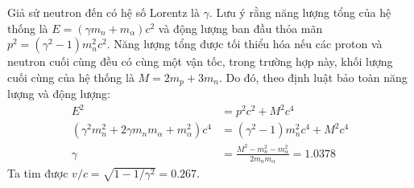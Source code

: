 \begin{solution}
Giả sử neutron đến có hệ số Lorentz là $\gamma$. Lưu ý rằng năng lượng tổng của hệ thống là $E =(\gamma m_n + m_\alpha)c^2$ và động lượng ban đầu thỏa mãn $p^2 = (\gamma^2 - 1)m_n^2 c^2$. Năng lượng tổng được tối thiểu hóa nếu các proton và neutron cuối cùng đều có cùng một vận tốc, trong trường hợp này, khối lượng cuối cùng của hệ thống là $M=2m_p + 3m_n$. Do đó, theo định luật bảo toàn năng lượng và động lượng:
\begin{align*}E^2 &= p^2 c^2 + M^2 c^4\\ (\gamma^2 m_n^2 + 2\gamma m_n m_\alpha + m_\alpha ^2)c^4 &= (\gamma^2 - 1)m_n^2 c^4 + M^2 c^4\\ \gamma &= \frac{M^2 - m_n^2 - m_\alpha^2}{2m_n m_\alpha} = 1.0378\end{align*}
Ta tim được $v/c = \sqrt{1 - 1/\gamma^2} = \boxed{0.267}$.
\end{solution}